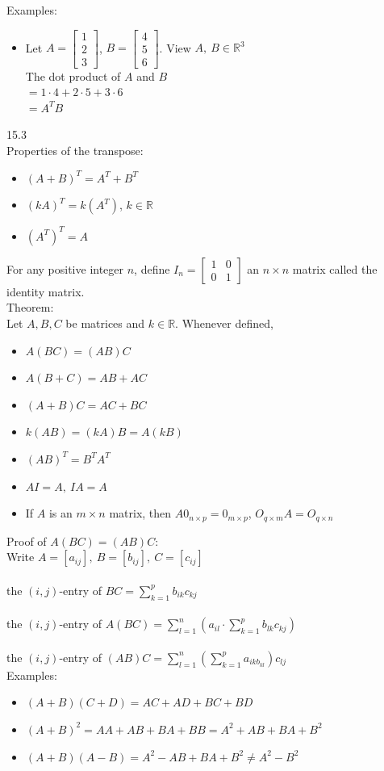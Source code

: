 \documentclass[]{article}
\begin{document}
		Examples:
		\begin{itemize}
			\item Let $A=\begin{bmatrix}{1}\\{2}\\{3}\end{bmatrix}$, $B=\begin{bmatrix}{4}\\{5}\\{6}\end{bmatrix}$. View $A,~B\in\mathbb{R}^3$\\
			The dot product of $A$ and $B$\\
			$=1\cdot 4+2\cdot 5+3\cdot 6$\\
			$=A^TB$
		\end{itemize}
		\large{15.3}\\
		\normalsize
		Properties of the transpose:
		\begin{itemize}
			\item $(A+B)^T=A^T+B^T$
			\item $(kA)^T=k(A^T)$, $k\in\mathbb{R}$
			\item $(A^T)^T=A$
		\end{itemize}
		For any positive integer $n$, define $I_n=\begin{bmatrix}{1}&{0}\\{0}&{1}\end{bmatrix}$ an $n\times n$ matrix called the identity matrix.\\
		\large{Theorem:}\\
		\normalsize
		Let $A,B,C$ be matrices and $k\in\mathbb{R}$. Whenever defined,
		\begin{itemize}
			\item $A(BC)=(AB)C$
			\item $A(B+C)=AB+AC$
			\item $(A+B)C=AC+BC$
			\item $k(AB)=(kA)B=A(kB)$
			\item $(AB)^T=B^TA^T$
			\item $AI=A,~IA=A$
			\item If $A$ is an $m\times n$ matrix, then $A0_{n\times p}=0_{m\times p}$, $O_{q\times m}A=O_{q\times n}$
		\end{itemize}
		Proof of $A(BC)=(AB)C$:\\
		Write $A=[a_{ij}],~B=[b_{ij}],~C=[c_{ij}]$\\\\
		the $(i,j)$-entry of $BC=\sum^p_{k=1}b_{ik}c_{kj}$\\\\
		the $(i,j)$-entry of $A(BC)=\sum^n_{l=1}\left(a_{il}\cdot\sum_{k=1}^pb_{lk}c_{kj}\right)$\\\\
		the $(i,j)$-entry of $(AB)C=\sum^n_{l=1}\left(\sum^p_{k=1}a_{ikb_{kl}}\right)c_{lj}$
		\pagebreak\\
		Examples:
		\begin{itemize}
			\item $(A+B)(C+D)=AC+AD+BC+BD$
			\item $(A+B)^2=AA+AB+BA+BB=A^2+AB+BA+B^2$
			\item $(A+B)(A-B)=A^2-AB+BA+B^2\ne A^2-B^2$
		\end{itemize}
\end{document}

